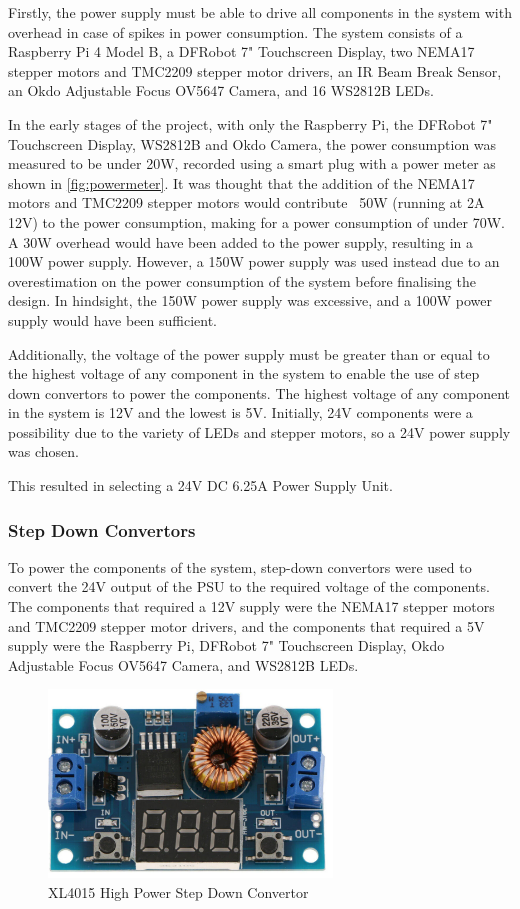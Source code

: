 Firstly, the power supply must be able to drive all components in the system with overhead in case of spikes in power consumption. The system consists of a Raspberry Pi 4 Model B, a DFRobot 7" Touchscreen Display, two NEMA17 stepper motors and TMC2209 stepper motor drivers, an IR Beam Break Sensor, an Okdo Adjustable Focus OV5647 Camera, and 16 WS2812B LEDs. 

In the early stages of the project, with only the Raspberry Pi, the DFRobot 7" Touchscreen Display, WS2812B and Okdo Camera, the power consumption was measured to be under 20W, recorded using a smart plug with a power meter as shown in \autoref{fig:powermeter}. It was thought that the addition of the NEMA17 motors and TMC2209 stepper motors would contribute ~50W (running at 2A 12V) to the power consumption, making for a power consumption of under 70W. A 30W overhead would have been added to the power supply, resulting in a 100W power supply. However, a 150W power supply was used instead due to an overestimation on the power consumption of the system before finalising the design. In hindsight, the 150W power supply was excessive, and a 100W power supply would have been sufficient.

Additionally, the voltage of the power supply must be greater than or equal to the highest voltage of any component in the system to enable the use of step down convertors to power the components. The highest voltage of any component in the system is 12V and the lowest is 5V. Initially, 24V components were a possibility due to the variety of LEDs and stepper motors, so a 24V power supply was chosen.

This resulted in selecting a 24V DC 6.25A Power Supply Unit.

\subsubsection{Step Down Convertors}
To power the components of the system, step-down convertors were used to convert the 24V output of the PSU to the required voltage of the components. The components that required a 12V supply were the NEMA17 stepper motors and TMC2209 stepper motor drivers, and the components that required a 5V supply were the Raspberry Pi, DFRobot 7" Touchscreen Display, Okdo Adjustable Focus OV5647 Camera, and WS2812B LEDs.

\begin{figure}[H]
    \begin{minipage}[h]{\textwidth}
        \centering
        \includegraphics[height=5cm]{imgs/parts/stepdownconverter.jpg}
        \caption{XL4015 High Power Step Down Convertor \cite{stepdownconverter}}
    \end{minipage}
\end{figure}

